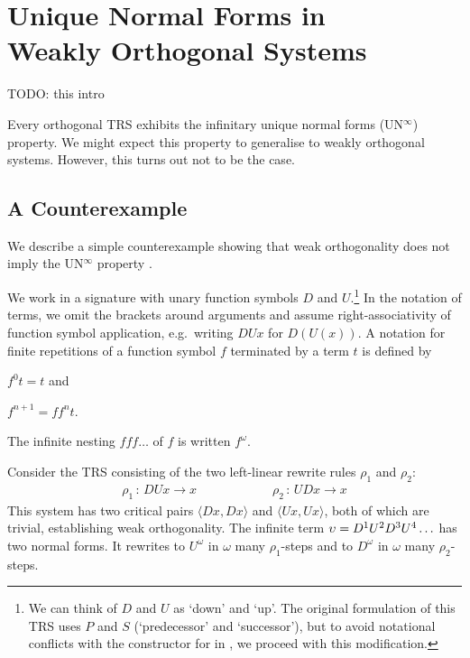 \chapter[\texorpdfstring{UN$^\infty$ in Weakly Orthogonal Systems}{UN
  in Weakly Orthogonal Systems}]{\texorpdfstring{Unique Normal Forms
    in\\Weakly Orthogonal Systems}{Unique Normal Forms in Weakly
    Orthogonal Systems}}\label{chap:unwo}

TODO: this intro

Every orthogonal TRS exhibits the infinitary unique normal forms
(UN$^\infty$) property. We might expect this property to generalise to
weakly orthogonal systems. However, this turns out not to be the
case.


\section{A Counterexample}\label{sec:counterexample}


We describe a simple counterexample showing that weak orthogonality
does not imply the UN$^\infty$ property \citep{endrullis-10}.

We work in a signature with unary function symbols $D$ and
$U$.\footnote{We can think of $D$ and $U$ as `down' and `up'. The
  original formulation of this TRS uses $P$ and $S$ (`predecessor' and
  `successor'), but to avoid notational conflicts with the
  constructor for
  in \Coq, we proceed with this modification.}
In the notation of terms, we omit the brackets around arguments and
assume right-associativity of function symbol application,
e.g.\ writing $DUx$ for $D(U(x))$. A notation for finite repetitions
of a function symbol $f$ terminated by a term $t$ is defined by
\begin{inparaenum}[(i)]
\item $f^0 t = t$ and
\item $f^{n+1} = ff^nt$.
\end{inparaenum}
The infinite nesting $fff \ldots$ of $f$ is written $f^\omega$.

Consider the TRS consisting of the two left-linear rewrite rules
$\rho_1$ and $\rho_2$:
\begin{align*}
  \rho_1 \, : \, DUx \to x \qquad \qquad \qquad
  \rho_2 \, : \, UDx \to x
\end{align*}
This system has two critical pairs $\langle Dx, Dx \rangle$ and
$\langle Ux, Ux \rangle$, both of which are trivial, establishing
weak orthogonality. The infinite term $\upsilon = D^1 U^2 D^3 U^4 \ldots$
has two normal forms. It rewrites to $U^\omega$ in $\omega$ many
$\rho_1$-steps and to $D^\omega$ in $\omega$ many $\rho_2$-steps.

